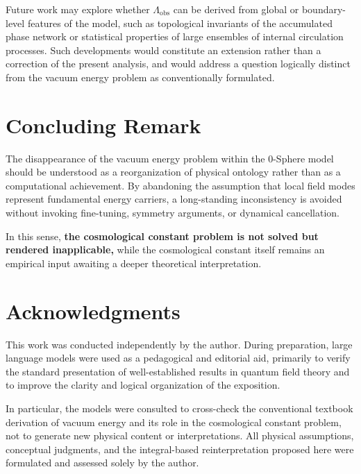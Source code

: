 \documentclass[12pt,letterpaper]{article}
\begin{document}
Future work may explore whether $\Lambda_{\mathrm{obs}}$ can be derived from global or boundary-level features of the model, such as topological invariants of the accumulated phase network or statistical properties of large ensembles of internal circulation processes. Such developments would constitute an extension rather than a correction of the present analysis, and would address a question logically distinct from the vacuum energy problem as conventionally formulated.

\section{Concluding Remark}

The disappearance of the vacuum energy problem within the 0-Sphere model should be understood as a reorganization of physical ontology rather than as a computational achievement. By abandoning the assumption that local field modes represent fundamental energy carriers, a long-standing inconsistency is avoided without invoking fine-tuning, symmetry arguments, or dynamical cancellation.

In this sense, \textbf{the cosmological constant problem is not solved but rendered inapplicable,} while the cosmological constant itself remains an empirical input awaiting a deeper theoretical interpretation.

\section*{Acknowledgments}

This work was conducted independently by the author. During preparation, large language models were used as a pedagogical and editorial aid, primarily to verify the standard presentation of well-established results in quantum field theory and to improve the clarity and logical organization of the exposition. 

In particular, the models were consulted to cross-check the conventional textbook derivation of vacuum energy and its role in the cosmological constant problem, not 
to generate new physical content or interpretations. All physical assumptions, conceptual judgments, and the integral-based reinterpretation proposed here were formulated and assessed solely by the author.
\end{document}
